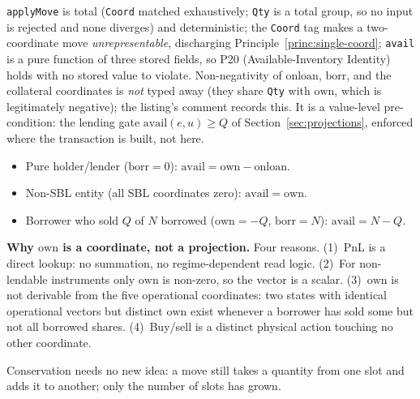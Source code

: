 \begin{remark}
\verb|applyMove| is total (\verb|Coord| matched exhaustively; \verb|Qty| is a total group, so no input is rejected and none diverges) and deterministic; the \verb|Coord| tag makes a two-coordinate move \emph{unrepresentable}, discharging Principle~\ref{princ:single-coord}; \verb|avail| is a pure function of three stored fields, so P20 (Available-Inventory Identity) holds with no stored value to violate. Non-negativity of $\mathrm{onloan}$, $\mathrm{borr}$, and the collateral coordinates is \emph{not} typed away (they share \verb|Qty| with $\mathrm{own}$, which is legitimately negative); the listing's comment records this. It is a value-level pre-condition: the lending gate $\mathrm{avail}(e,u)\geq Q$ of Section~\ref{sec:projections}, enforced where the transaction is built, not here.
\end{remark}

\begin{remark}
\hfill
\begin{itemize}[nosep]
\item Pure holder/lender ($\mathrm{borr}=0$): $\mathrm{avail} = \mathrm{own} - \mathrm{onloan}$.
\item Non-SBL entity (all SBL coordinates zero): $\mathrm{avail} = \mathrm{own}$.
\item Borrower who sold $Q$ of $N$ borrowed ($\mathrm{own}=-Q$, $\mathrm{borr}=N$): $\mathrm{avail} = N - Q$.
\end{itemize}
\end{remark}

\noindent\textbf{Why $\mathrm{own}$ is a coordinate, not a projection.} Four reasons. (1)~PnL is a direct lookup: no summation, no regime-dependent read logic. (2)~For non-lendable instruments only $\mathrm{own}$ is non-zero, so the vector is a scalar. (3)~$\mathrm{own}$ is not derivable from the five operational coordinates: two states with identical operational vectors but distinct $\mathrm{own}$ exist whenever a borrower has sold some but not all borrowed shares. (4)~Buy/sell is a distinct physical action touching no other coordinate.

Conservation needs no new idea: a move still takes a quantity from one slot and adds it to another; only the number of slots has grown.

